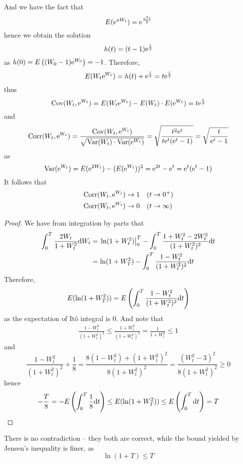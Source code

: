 \documentclass{homework}
\begin{document}
    And we have the fact that
    \[E(\mathrm e^{uW_t})=\mathrm e^{\frac{u^2t}2}\]
    hence we obtain the solution
    \[h(t)=(t-1)\mathrm e^{\frac{t}{2}}\]
    as $h(0)=E\left((W_0-1)\mathrm e^{W_0}\right)=-1$.
    Therefore,
    \[E(W_t\mathrm e^{W_t})=h(t)+\mathrm e^{\frac{t}{2}}=t\mathrm e^{\frac{t}{2}}\]
    thus
    \def\cov{\mathrm{Cov}}
    \def\var{\mathrm{Var}}
    \def\corr{\mathrm{Corr}}
    \[\cov(W_t,\e^{W_t})=E(W_t\e^{W_t})-E(W_t)\cdot E(\e^{W_t})
    =t\e^{\frac{t}{2}}\]
    and
    \[\corr(W_t,\e^{W_t})=\frac{\cov(W_t,\e^{W_t})}%
    {\sqrt{\var(W_t)\cdot\var(\e^{W_t})}}
    =\sqrt{\frac{t^2\e^t}{t\e^t(\e^t-1)}}
    =\sqrt{\frac{t}{\e^t-1}}\]
    as
    \[\var(\e^{W_t})=E(\e^{2W_t})-(E(\e^{W_t}))^2
    =\e^{2t}-\e^t=
    \e^t(\e^t-1)\]
    It follows that
    \[\begin{aligned}
        \corr(W_t,\e^{W_t})&\to 1\quad(t\to 0^+)\\
        \corr(W_t,\e^{W_t})&\to 0\quad(t\to \infty)
    \end{aligned}\]

    \problem
    \begin{proof}
        We have from integration by parts that
        \[\begin{aligned}
            \int_0^T\frac{2W_t}{1+W_t^2}\mathrm d W_t
            &=\left.\ln(1+W_t^2)\right|_0^T
            -\int_0^T\frac{1+W_t^2-2W_t^2}{(1+W_t^2)^2}\mathrm d t\\
            &=\ln(1+W_T^2)-\int_0^T\frac{1-W_t^2}{(1+W_t^2)^2}\mathrm d t
        \end{aligned}\]
        Therefore,
        \[E(\ln(1+W_T^2))=E\left(
            \int_0^T\frac{1-W^2_t}{(1+W_t^2)^2}\mathrm d t
        \right)\]
        as the expectation of It\^o integral is 0.
        And note that
        \[\begin{aligned}
            \frac{1-W_t^2}{(1+W_t^2)^2}\leq\frac{1+W_t^2}{(1+W_t^2)^2}
            =\frac{1}{1+W_t^2}\leq 1
        \end{aligned}\]
        and
        \[\frac{1-W_t^2}{(1+W_t^2)^2}+\frac{1}{8}
        =\frac{8(1-W_t^2)+(1+W_t^2)^2}{8(1+W_t^2)^2}
        =\frac{(W_t^2-3)^2}{8(1+W_t^2)^2}\geq 0\]
        hence
        \[-\frac{T}{8}=-E\left(\int_0^T\frac{1}{8}\mathrm d t\right)
        \leq E(\ln(1+W_T^2))
        \leq E\left(\int_0^T\mathrm d t\right)=T\]
    \end{proof}
    There is no contradiction -- they both are correct, while the
    bound yielded by Jensen's inequality is finer, as
    \[\ln(1+T)\leq T\]
\end{document}

